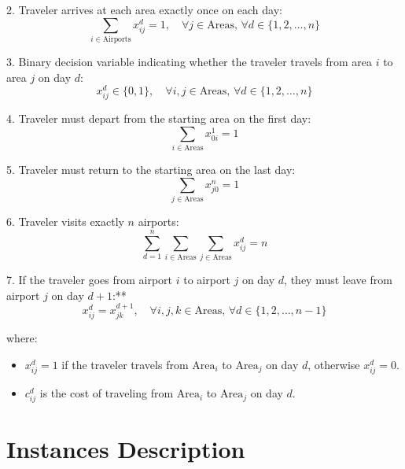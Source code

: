 2. Traveler arrives at each area exactly once on each day:
\begin{equation}
    \sum_{i \in \text{Airports}} x^d_{ij} = 1, \quad \forall j \in \text{Areas}, \, \forall d \in \{1, 2, \ldots, n\}
\end{equation}

3. Binary decision variable indicating whether the traveler travels from area \(i\) to area \(j\) on day \(d\):
\begin{equation}
    x^d_{ij} \in \{0, 1\}, \quad \forall i, j \in \text{Areas}, \, \forall d \in \{1, 2, \ldots, n\}
\end{equation}

4. Traveler must depart from the starting area on the first day:
\begin{equation}
    \sum_{i \in \text{Areas}} x^1_{0i} = 1
\end{equation}

5. Traveler must return to the starting area on the last day:
\begin{equation}
    \sum_{j \in \text{Areas}} x^n_{j0} = 1
\end{equation}

6. Traveler visits exactly \( n \) airports:
\begin{equation}
    \sum_{d=1}^{n} \sum_{i \in \text{Areas}} \sum_{j \in \text{Areas}} x^d_{ij} = n
\end{equation}

7. If the traveler goes from airport \( i \) to airport \( j \) on day \( d \), they must leave from airport \( j \) on day \( d+1 \):**
\begin{equation}
    x^d_{ij} = x^{d+1}_{jk}, \quad \forall i, j, k \in \text{Areas}, \, \forall d \in \{1, 2, \ldots, n-1\}
\end{equation}


where:

\begin{itemize}
    \item \( x^d_{ij} = 1 \) if the traveler travels from \( \text{Area}_i \) to \( \text{Area}_j \) on day \( d \), otherwise \( x^d_{ij} = 0 \).
    \item \( c^d_{ij} \) is the cost of traveling from \( \text{Area}_i \) to \( \text{Area}_j \) on day \( d \).
\end{itemize}




\section{Instances Description}

